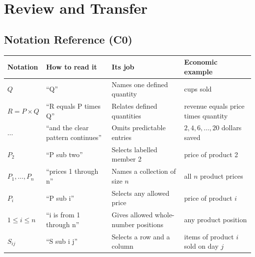 	
	\section{Review and Transfer}
	\label{sec:review-transfer}
	
	
	\subsection{Notation Reference (C0)}
	\label{sec:reference-c0}
	
	\begin{center}
		\small
		\begin{tabularx}{\textwidth}{lXXX}
			\toprule
			\textbf{Notation} & \textbf{How to read it} & \textbf{Its job} & \textbf{Economic example} \\
			\midrule
			$Q$ & ``Q'' & Names one defined quantity & cups sold \\
			$R=P\times Q$ & ``R equals P times Q'' & Relates defined quantities & revenue equals price times quantity \\
			$\ldots$ & ``and the clear pattern continues'' & Omits predictable entries & $2,4,6,\ldots,20$ dollars saved \\
			$P_2$ & ``P sub two'' & Selects labelled member 2 & price of product 2 \\
			$P_1,\ldots,P_n$ & ``prices 1 through n'' & Names a collection of size $n$ & all $n$ product prices \\
			$P_i$ & ``P sub i'' & Selects any allowed price & price of product $i$ \\
			$1\leq i\leq n$ & ``i is from 1 through n'' & Gives allowed whole-number positions & any product position \\
			$S_{ij}$ & ``S sub i j'' & Selects a row and a column & items of product $i$ sold on day $j$ \\
			\bottomrule
		\end{tabularx}
	\end{center}
	
